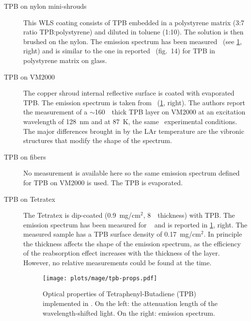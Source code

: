 \begin{description}

  \item[TPB on nylon mini-shrouds] This WLS coating consists of TPB embedded in a
    polystyrene matrix (3:7 ratio TPB:polystyrene) and diluted in toluene (1:10).  The
    solution is then brushed on the nylon. The emission spectrum has been
    measured~\cite{Walter2015} (see \cref{fig:bkg:lar:ph2:mage:tpb-props}, right) and is
    similar to the one in reported~\cite{Francini2013} (fig.~14) for TPB in polystyrene
    matrix on glass.

  \item[TPB on VM2000] The copper shroud internal reflective surface is coated with
    evaporated TPB. The emission spectrum is taken from~\cite{Francini2013}
    (\cref{fig:bkg:lar:ph2:mage:tpb-props}, right).  The authors report the measurement of
    a $\sim$160~\mum\ thick TPB layer on VM2000 at an excitation wavelength of 128~nm and
    at 87~K, the same \gerda\ experimental conditions. The major differences brought in by
    the LAr temperature are the vibronic structures that modify the shape of the spectrum.

  \item[TPB on fibers] No measurement is available here so the same emission spectrum
    defined for TPB on VM2000 is used. The TPB is evaporated.

  \item[TPB on Tetratex\reg{}] The Tetratex\reg{} is dip-coated (0.9~mg/cm$^2$, 8~\mum\
    thickness) with TPB. The emission spectrum has been measured for
    \gerda~\cite{Baudis2015a} and is reported in \cref{fig:bkg:lar:ph2:mage:tpb-props},
    right. The measured sample has a TPB surface density of 0.17~mg/cm$^2$. In principle
    the thickness affects the shape of the emission spectrum, as the efficiency of the
    reabsorption effect increases with the thickness of the layer. However, no relative
    measurements could be found at the time.

    \begin{figure}
      \centering
      \texttt{[image: plots/mage/tpb-props.pdf]}
      \caption{%
        Optical properties of Tetraphenyl-Butadiene (TPB) implemented in \mage. On the
        left: the attenuation length of the wavelength-shifted light. On the right:
        emission spectrum.
      }\label{fig:bkg:lar:ph2:mage:tpb-props}
    \end{figure}

\end{description}

